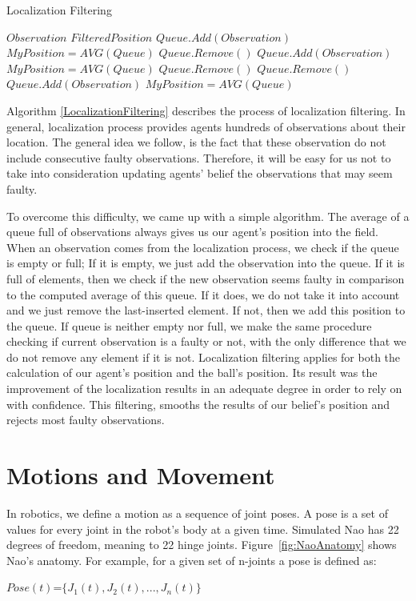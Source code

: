 \begin{algorithm}[ht!]
\caption{Localization Filtering}
\label{LocalizationFiltering}
\begin{algorithmic}[1]
$Observation$
$FilteredPosition$
\STATE $Queue.Add(Observation)$
\STATE $MyPosition = AVG(Queue)$
\STATE $Queue.Remove()$
\ELSE
\STATE $Queue.Add(Observation)$
\STATE $MyPosition = AVG(Queue)$
\ENDIF
\ELSE
{}
\STATE $Queue.Remove()$
\ELSE
\STATE $Queue.Remove()$
\STATE $Queue.Add(Observation)$
\STATE $MyPosition = AVG(Queue)$
\ENDIF
\ENDIF
\end{algorithmic}
\end{algorithm}

Algorithm \ref{LocalizationFiltering} describes the process of localization filtering. In general, localization process provides agents hundreds of observations about their location. The general idea we follow, is the fact that these observation do not include consecutive faulty observations. Therefore, it will be easy for us not to take into consideration updating agents' belief the observations that may seem faulty. 

To overcome this difficulty, we came up with a simple algorithm. The average of a queue full of observations always gives us our agent's position into the field. When an observation comes from the localization process, we check if the queue is empty or full; If it is empty, we just add the observation into the queue. If it is full of elements, then we check if the new observation seems faulty in comparison to the computed average of this queue. If it does, we do not take it into account and we just remove the last-inserted element. If not, then we add this position to the queue.
If queue is neither empty nor full, we make the same procedure checking if current observation is a faulty or not, with the only difference that we do not remove any element if it is not. Localization filtering applies for both the calculation of our agent's position and the ball's position. Its result was the improvement of the localization results in an adequate degree in order to rely on with confidence. This filtering, smooths the results of our belief's position and rejects most faulty observations.





\section{Motions and Movement}
\label{Motions}
In robotics, we define a motion as a sequence of joint poses. A pose is a set of values for every joint in the robot's body at a given time. Simulated Nao has 22 degrees of freedom, meaning to 22 hinge joints. Figure~\ref{fig:NaoAnatomy} shows Nao's anatomy.
For example, for a given set of n-joints a pose is defined as:\\
\begin{center}
$Pose(t)$=$\lbrace J_{1}(t),J_{2}(t),...,J_{n}(t) \rbrace$\\
\end{center}


